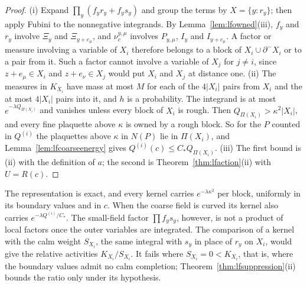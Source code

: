 \documentclass[11pt]{amsart}
\theoremstyle{definition}
\theoremstyle{remark}
\numberwithin{equation}{section}
\begin{document}
\begin{proof}
(i) Expand $\prod_y(f_yr_y+f_ys_y)$ and group the terms by $X=\{y:r_y\}$;
then apply Fubini to the nonnegative integrands. By
Lemma~\ref{lem:lfowned}(iii), $f_y$ and $r_y$ involve $\varXi_y$ and
$\varXi_{y+e_\mu}$, and $\nu^{y,\mu}_c$ involves $P_{y,\mu}$, $I_y$ and
$I_{y+e_\mu}$. A factor or measure involving a variable of $X_i$ therefore
belongs to a block of $X_i\cup\partial^-X_i$ or to a pair from it. Such a
factor cannot involve a variable of $X_j$ for $j\ne i$, since $z+e_\mu\in
X_i$ and $z+e_\nu\in X_j$ would put $X_i$ and $X_j$ at distance one.
(ii) The measures in $K_{X_i}$ have mass at most $M$ for each of the
$4|X_i|$ pairs from $X_i$ and the at most $4|X_i|$ pairs into it, and $h$
is a probability. The integrand is at most $e^{-\lambda Q_{\Pi(X_i)}}$
and vanishes unless every block of $X_i$ is rough. Then $Q_{\Pi(X_i)}>
\kappa^2|X_i|$, and every fine plaquette above $\kappa$ is owned by a rough
block. So for the $P$ counted in $Q^{(i)}$ the plaquettes above $\kappa$
in $N(P)$ lie in $\Pi(X_i)$, and Lemma~\ref{lem:lfcoarseenergy} gives
$Q^{(i)}(c)\le C_*Q_{\Pi(X_i)}$.
(iii) The first bound is (ii) with the definition of $a$; the second is
Theorem~\ref{thm:lfaction}(ii) with $U=R(c)$.
\end{proof}

The representation is exact, and every kernel carries $e^{-\lambda\kappa^2}$
per block, uniformly in its boundary values and in $c$. When the coarse
field is curved its kernel also carries $e^{-\lambda Q^{(i)}/C_*}$. The
small-field factor $\prod f_ys_y$, however, is not a product of local
factors once the outer variables are integrated. The comparison of a kernel
with the calm weight $S_{X_i}$, the same integral with $s_y$ in place of
$r_y$ on $X_i$, would give the relative activities $K_{X_i}/S_{X_i}$. It
fails where $S_{X_i}=0<K_{X_i}$, that is, where the boundary values admit
no calm completion; Theorem~\ref{thm:lfsuppression}(ii) bounds the ratio
only under its hypothesis.
\end{document}
